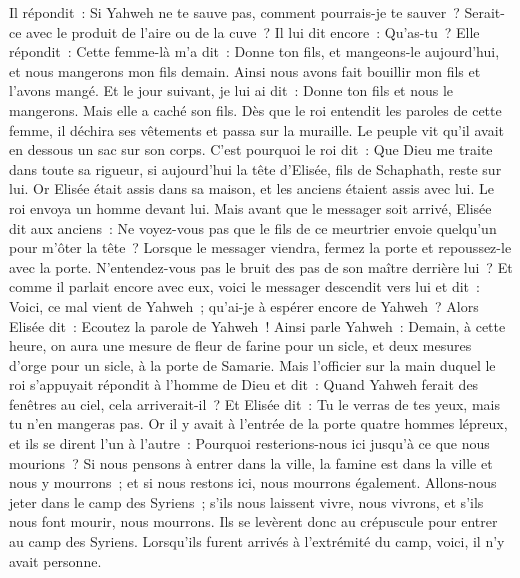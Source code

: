 \begin{multicols}{2}
Il répondit~: Si Yahweh ne te sauve pas, comment pourrais-je te sauver~? Serait-ce avec le produit de l'aire ou de la cuve~?
Il lui dit encore~: Qu'as-tu~? Elle répondit~: Cette femme-là m'a dit~: Donne ton fils, et mangeons-le aujourd'hui, et nous mangerons mon fils demain.
Ainsi nous avons fait bouillir mon fils et l'avons mangé. Et le jour suivant, je lui ai dit~: Donne ton fils et nous le mangerons. Mais elle a caché son fils.
Dès que le roi entendit les paroles de cette femme, il déchira ses vêtements et passa sur la muraille. Le peuple vit qu'il avait en dessous un sac sur son corps.
C'est pourquoi le roi dit~: Que Dieu me traite dans toute sa rigueur, si aujourd'hui la tête d'Elisée, fils de Schaphath, reste sur lui.
Or Elisée était assis dans sa maison, et les anciens étaient assis avec lui. Le roi envoya un homme devant lui. Mais avant que le messager soit arrivé, Elisée dit aux anciens~: Ne voyez-vous pas que le fils de ce meurtrier envoie quelqu'un pour m'ôter la tête~? Lorsque le messager viendra, fermez la porte et repoussez-le avec la porte. N'entendez-vous pas le bruit des pas de son maître derrière lui~?
Et comme il parlait encore avec eux, voici le messager descendit vers lui et dit~: Voici, ce mal vient de Yahweh~; qu'ai-je à espérer encore de Yahweh~?
\VerseOne{}Alors Elisée dit~: Ecoutez la parole de Yahweh~! Ainsi parle Yahweh~: Demain, à cette heure, on aura une mesure de fleur de farine pour un sicle, et deux mesures d'orge pour un sicle, à la porte de Samarie.
Mais l'officier sur la main duquel le roi s'appuyait répondit à l'homme de Dieu et dit~: Quand Yahweh ferait des fenêtres au ciel, cela arriverait-il~? Et Elisée dit~: Tu le verras de tes yeux, mais tu n'en mangeras pas.
Or il y avait à l'entrée de la porte quatre hommes lépreux, et ils se dirent l'un à l'autre~: Pourquoi resterions-nous ici jusqu'à ce que nous mourions~?
Si nous pensons à entrer dans la ville, la famine est dans la ville et nous y mourrons~; et si nous restons ici, nous mourrons également. Allons-nous jeter dans le camp des Syriens~; s'ils nous laissent vivre, nous vivrons, et s'ils nous font mourir, nous mourrons.
Ils se levèrent donc au crépuscule pour entrer au camp des Syriens. Lorsqu'ils furent arrivés à l'extrémité du camp, voici, il n'y avait personne.

\end{multicols}
